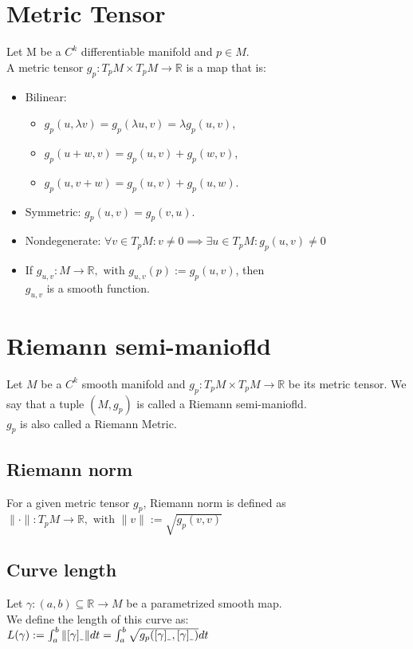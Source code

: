 \documentclass[a4paper, 11pt]{article}
\newcommand{\Real}{\mathbb{R}}
\begin{document}
\section{Metric Tensor}
Let M be a $C^k$ differentiable manifold and $p \in M$. \\
A metric tensor $g_p: T_pM \times T_pM \rightarrow \Real$ is a map that is: \\
\begin{itemize}
  \item Bilinear: 
		\begin{itemize}
			\item $g_p(u, \lambda v) = g_p(\lambda u, v) = \lambda g_p(u, v)$,
			\item $g_p(u + w, v) = g_p(u, v) + g_p(w, v)$,
			\item $g_p(u, v + w) = g_p(u, v) + g_p(u, w)$.
		\end{itemize}
  \item Symmetric: $g_p(u, v) = g_p(v, u)$.
  \item Nondegenerate:	$\forall v \in T_pM: v \neq 0 \implies \exists u \in T_pM: g_p(u, v) \neq 0$
  \item If $g_{u, v}: M \rightarrow \Real, \text{ with } g_{u, v}(p) := g_p(u, v)$, then \\
$g_{u, v}$ is a smooth function.
\end{itemize}

\section{Riemann semi-maniofld}
Let $M$ be a $C^k$ smooth manifold and $g_p: T_pM \times T_pM \rightarrow \Real$ be its metric tensor. We say that a tuple $(M, g_p)$ is called a Riemann semi-maniofld. \\
$g_p$ is also called a Riemann Metric.

\subsection{Riemann norm}
For a given metric tensor $g_p$, Riemann norm is defined as $\|\cdot\|: T_pM \rightarrow \Real, \text{ with } \|v\| := \sqrt{g_p(v, v)}$

\subsection{Curve length}
Let $\gamma: (a, b) \subseteq \Real \rightarrow M$ be a parametrized smooth map. \\
We define the length of this curve as: \\
$L(\gamma) := \int_a^b \|[\gamma]_\text{\texttildelow}\| dt = \int_a^b \sqrt{g_p([\gamma]_\text{\texttildelow}, [\gamma]_\text{\texttildelow})} dt$
\end{document}
